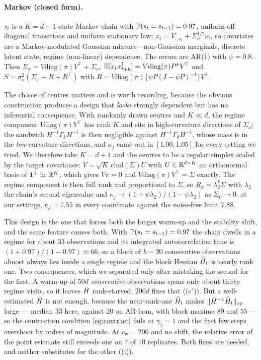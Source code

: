 \paragraph{Markov (closed form).}
$s_t$ is a $K=d+1$ state Markov chain with $\mathbb{P}(s_t=s_{t-1})=0.97$, uniform off-diagonal
transitions and uniform stationary law; $x_t=V_{\cdot,s_t}+\Sigma_\nu^{1/2}\nu_t$, so
covariates are a Markov-modulated Gaussian mixture---non-Gaussian marginals, discrete latent
state, regime (non-linear) dependence. The errors are AR(1) with $\psi=0.8$. Then
$\Sigma_x=V\mathrm{diag}(\pi)V^{\!\top}+\Sigma_\nu$,
$\mathbb{E}[x_tx_{t+k}^{\!\top}]=V\mathrm{diag}(\pi)P^{k}V^{\!\top}$ and
$S=\sigma_u^2(\Sigma_x+R+R^{\!\top})$ with
$R=V\mathrm{diag}(\pi)\{\psi P(I-\psi P)^{-1}\}V^{\!\top}$.

The choice of centres matters and is worth recording, because the obvious construction
produces a design that \emph{looks} strongly dependent but has no inferential consequence.
With randomly drawn centres and $K\ll d$, the regime component
$V\mathrm{diag}(\pi)V^{\!\top}$ has rank $K$ and sits in high-curvature directions of
$\Sigma_x$; the sandwich $H^{-1}\Gamma_kH^{-1}$ is then negligible against
$H^{-1}\Gamma_0H^{-1}$, whose mass is in the \emph{low}-curvature directions, and $\kappa_j$
came out in $[1.00,1.05]$ for every setting we tried. We therefore take $K=d+1$ and the
centres to be a regular simplex scaled by the target covariance:
$V=\sqrt{K}\,\mathrm{chol}(\Sigma)U$ with $U\in\mathbb{R}^{d\times K}$ an orthonormal basis of
$\mathbf 1^{\perp}$ in $\mathbb{R}^{K}$, which gives $V\pi=0$ and
$V\mathrm{diag}(\pi)V^{\!\top}=\Sigma$ exactly. The regime component is then full rank and
proportional to $\Sigma$, so $R_k=\lambda_2^{k}\Sigma$ with $\lambda_2$ the chain's second
eigenvalue and $\kappa_j\to(1+\psi\lambda_2)/(1-\psi\lambda_2)$ as $\Sigma_\nu\to0$: at our
settings, $\kappa_j=7.55$ in every coordinate against the noise-free limit $7.88$.

This design is the one that forces both the longer warm-up and the stability shift, and the
same feature causes both. With $\mathbb{P}(s_t=s_{t-1})=0.97$ the chain dwells in a regime for about
$33$ observations and its integrated autocorrelation time is
$(1+0.97)/(1-0.97)\approx66$, so a block of $b=20$ consecutive observations almost always lies
inside a single regime and the block Hessian $\widehat H_t$ is nearly rank one. Two consequences,
which we separated only after mistaking the second for the first. A warm-up of $50d$
\emph{consecutive} observations spans only about thirty regime visits, so it leaves $\bar{H}$
rank-starved; $200d$ fixes that ((c$'$)). But a well-estimated $\bar{H}$ is not
enough, because the near-rank-one $\widehat H_t$ makes $\lVert \bar{H}^{-1}\widehat H_t \rVert_{\mathrm{op}}$ large --- median $33$
here, against $20$ on AR-hom, with block maxima $89$ and $55$ --- so the contraction condition
\eqref{eq:contract} fails at $\gamma_1=1$ and the first few steps overshoot by orders of
magnitude. At $c_{\mathrm w}=200$ and no shift, the relative error of the point estimate still
exceeds one on $7$ of $10$ replicates. Both fixes are needed, and neither substitutes for the
other ((i)).

